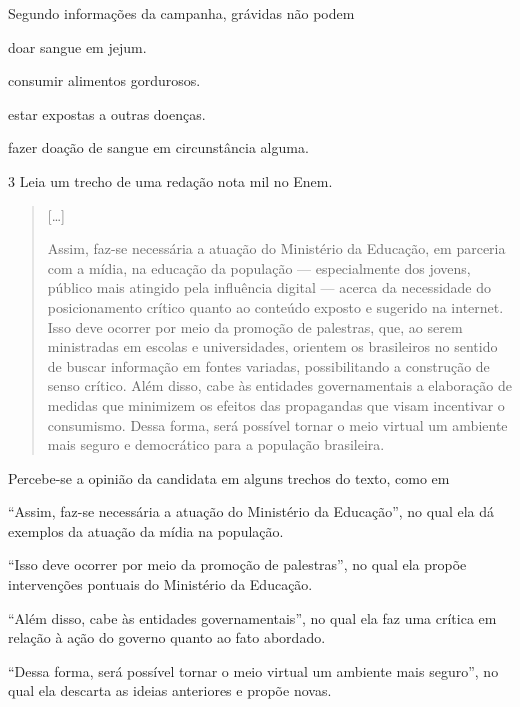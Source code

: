
Segundo informações da campanha, grávidas não podem

\begin{escolha}
\item doar sangue em jejum.

\item consumir alimentos gordurosos.

\item estar expostas a outras doenças.

\item fazer doação de sangue em circunstância alguma.
\end{escolha}

\num{3} Leia um trecho de uma redação nota mil no Enem.

\begin{quote}
{[}\ldots{}{]}

Assim, faz-se necessária a atuação do Ministério da Educação, em
parceria com a mídia, na educação da população --- especialmente dos
jovens, público mais atingido pela influência digital --- acerca da
necessidade do posicionamento crítico quanto ao conteúdo exposto e
sugerido na internet. Isso deve ocorrer por meio da promoção de
palestras, que, ao serem ministradas em escolas e universidades,
orientem os brasileiros no sentido de buscar informação em fontes
variadas, possibilitando a construção de senso crítico. Além disso, cabe
às entidades governamentais a elaboração de medidas que minimizem os
efeitos das propagandas que visam incentivar o consumismo. Dessa forma,
será possível tornar o meio virtual um ambiente mais seguro e
democrático para a população brasileira.

\end{quote}

Percebe-se a opinião da candidata em alguns trechos do texto, como em

\begin{escolha}
\item ``Assim, faz-se necessária a atuação do Ministério da Educação'', no
qual ela dá exemplos da atuação da mídia na população.

\item ``Isso deve ocorrer por meio da promoção de palestras'', no qual ela
propõe intervenções pontuais do Ministério da Educação.

\item ``Além disso, cabe às entidades governamentais'', no qual ela faz
uma crítica em relação à ação do governo quanto ao fato abordado.

\item ``Dessa forma, será possível tornar o meio virtual um ambiente mais
seguro'', no qual ela descarta as ideias anteriores e propõe novas.
\end{escolha}

